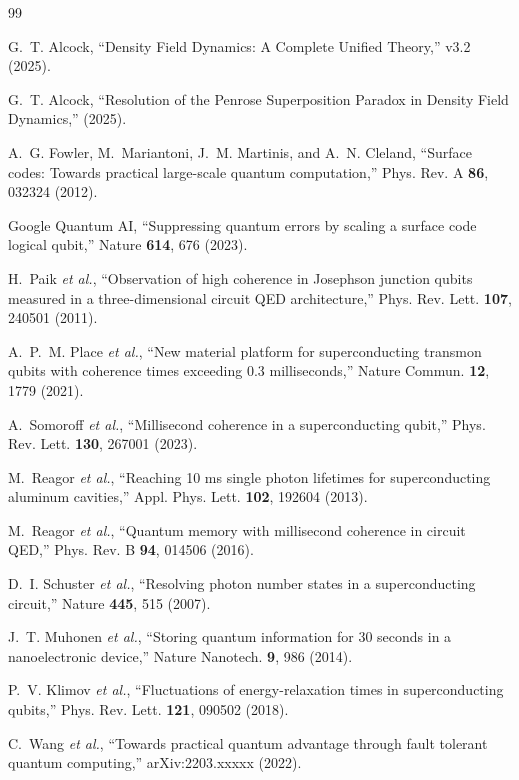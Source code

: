 \documentclass[aps,prl,twocolumn,superscriptaddress,nofootinbib,longbibliography]{revtex4-2}
\begin{document}
\begin{thebibliography}{99}

G.~T. Alcock, ``Density Field Dynamics: A Complete Unified Theory,''
v3.2 (2025).

G.~T. Alcock, ``Resolution of the Penrose Superposition Paradox in
Density Field Dynamics,'' (2025).

A.~G. Fowler, M.~Mariantoni, J.~M. Martinis, and A.~N. Cleland,
``Surface codes: Towards practical large-scale quantum computation,''
Phys. Rev. A \textbf{86}, 032324 (2012).

Google Quantum AI, ``Suppressing quantum errors by scaling a surface
code logical qubit,'' Nature \textbf{614}, 676 (2023).

H.~Paik \textit{et al.}, ``Observation of high coherence in Josephson
junction qubits measured in a three-dimensional circuit QED
architecture,'' Phys. Rev. Lett. \textbf{107}, 240501 (2011).

A.~P.~M. Place \textit{et al.}, ``New material platform for
superconducting transmon qubits with coherence times exceeding 0.3
milliseconds,'' Nature Commun. \textbf{12}, 1779 (2021).

A.~Somoroff \textit{et al.}, ``Millisecond coherence in a
superconducting qubit,'' Phys. Rev. Lett. \textbf{130}, 267001 (2023).

M.~Reagor \textit{et al.}, ``Reaching 10 ms single photon lifetimes
for superconducting aluminum cavities,'' Appl. Phys. Lett.
\textbf{102}, 192604 (2013).

M.~Reagor \textit{et al.}, ``Quantum memory with millisecond coherence
in circuit QED,'' Phys. Rev. B \textbf{94}, 014506 (2016).

D.~I. Schuster \textit{et al.}, ``Resolving photon number states in a
superconducting circuit,'' Nature \textbf{445}, 515 (2007).

J.~T. Muhonen \textit{et al.}, ``Storing quantum information for 30
seconds in a nanoelectronic device,'' Nature Nanotech. \textbf{9}, 986
(2014).

P.~V. Klimov \textit{et al.}, ``Fluctuations of energy-relaxation
times in superconducting qubits,'' Phys. Rev. Lett. \textbf{121},
090502 (2018).

C.~Wang \textit{et al.}, ``Towards practical quantum advantage through
fault tolerant quantum computing,'' arXiv:2203.xxxxx (2022).


\end{thebibliography}
\end{document}
